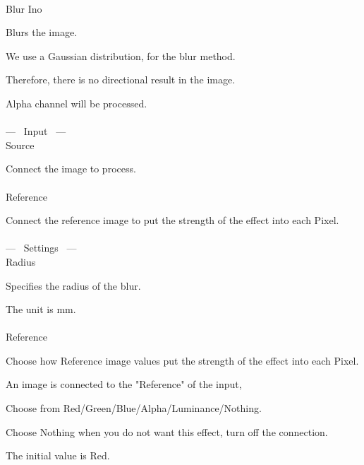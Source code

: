 \documentclass[a4paper,12pt]{article}
\begin{document}
\thispagestyle{empty}

\Large
\noindent \\
Blur Ino\medskip
\par
\normalsize
Blurs the image.\\
\par
We use a Gaussian distribution, for the blur method.\par
Therefore, there is no directional result in the image.\\
\par
Alpha channel will be processed.\\
\\
--- \ Input \ ---\\
Source\par
Connect the image to process.\\
\\
Reference\par
Connect the reference image to put the strength of the effect into each Pixel.\\
\\
--- \ Settings \ ---\\
Radius\par
Specifies the radius of the blur.\par
The unit is mm.\\
\\
Reference\par
Choose how Reference image values put the strength of the effect into each Pixel.\par
An image is connected to the "Reference" of the input,\par
Choose from Red/Green/Blue/Alpha/Luminance/Nothing.\par
Choose Nothing when you do not want this effect, turn off the connection.\par
The initial value is Red.
\end{document}
